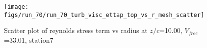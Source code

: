 \begin{figure}[H]
\centering
\texttt{[image: figs/run\_70/run\_70\_turb\_visc\_ettap\_top\_vs\_r\_mesh\_scatter]}
\caption{Scatter plot of reynolds stress term vs radius at $z/c$=10.00, $V_{free}$=33.01, station7}
\label{fig:run_70_turb_visc_ettap_top_vs_r_mesh_scatter}
\end{figure}


